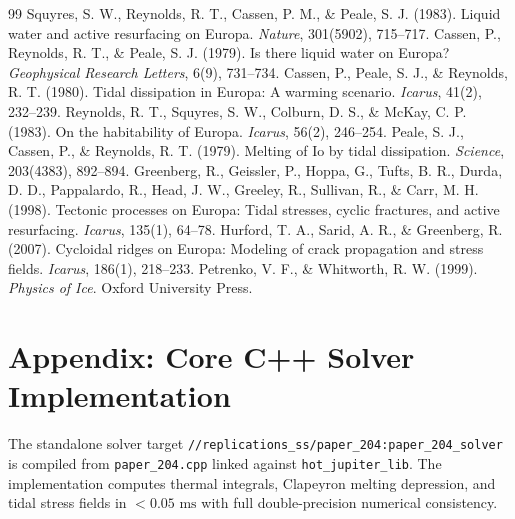\documentclass[11pt,a4paper]{article}
\begin{document}
\begin{thebibliography}{99}
 Squyres, S. W., Reynolds, R. T., Cassen, P. M., \& Peale, S. J. (1983). Liquid water and active resurfacing on Europa. \textit{Nature}, 301(5902), 715--717.
 Cassen, P., Reynolds, R. T., \& Peale, S. J. (1979). Is there liquid water on Europa? \textit{Geophysical Research Letters}, 6(9), 731--734.
 Cassen, P., Peale, S. J., \& Reynolds, R. T. (1980). Tidal dissipation in Europa: A warming scenario. \textit{Icarus}, 41(2), 232--239.
 Reynolds, R. T., Squyres, S. W., Colburn, D. S., \& McKay, C. P. (1983). On the habitability of Europa. \textit{Icarus}, 56(2), 246--254.
 Peale, S. J., Cassen, P., \& Reynolds, R. T. (1979). Melting of Io by tidal dissipation. \textit{Science}, 203(4383), 892--894.
 Greenberg, R., Geissler, P., Hoppa, G., Tufts, B. R., Durda, D. D., Pappalardo, R., Head, J. W., Greeley, R., Sullivan, R., \& Carr, M. H. (1998). Tectonic processes on Europa: Tidal stresses, cyclic fractures, and active resurfacing. \textit{Icarus}, 135(1), 64--78.
 Hurford, T. A., Sarid, A. R., \& Greenberg, R. (2007). Cycloidal ridges on Europa: Modeling of crack propagation and stress fields. \textit{Icarus}, 186(1), 218--233.
 Petrenko, V. F., \& Whitworth, R. W. (1999). \textit{Physics of Ice}. Oxford University Press.
\end{thebibliography}

\appendix
\section{Appendix: Core C++ Solver Implementation}
The standalone solver target \texttt{//replications\_ss/paper\_204:paper\_204\_solver} is compiled from \texttt{paper\_204.cpp} linked against \texttt{hot\_jupiter\_lib}. The implementation computes thermal integrals, Clapeyron melting depression, and tidal stress fields in $< 0.05\text{ ms}$ with full double-precision numerical consistency.
\end{document}
